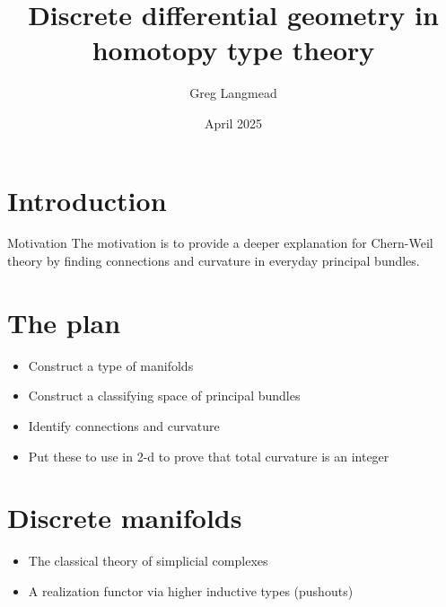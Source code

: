 \documentclass[14pt,aspectratio=169,compress]{beamer}
\title[Geometry in HoTT]{Discrete differential geometry in homotopy type theory}
\author{Greg Langmead}
\institute[CMU]{Carnegie Mellon University}
\date{April 2025}
\begin{document}
\begin{frame}
\titlepage
\end{frame}

\begin{frame}
\tableofcontents
\end{frame}


\section{Introduction}

\begin{frame}{Motivation}
The motivation is to provide \alert{a deeper explanation} for \alert{Chern-Weil theory} by finding \alert{connections} and \alert{curvature} in everyday \alert{principal bundles}.
\end{frame}


\section{The plan}
\begin{frame}
\begin{itemize}
\item Construct a type of manifolds
\item Construct a classifying space of principal bundles
\item Identify connections and curvature
\item Put these to use in 2-d to prove that total curvature is an integer
\end{itemize}
\end{frame}

\section{Discrete manifolds}

\begin{frame}
\begin{itemize}
\item The classical theory of \alert{simplicial complexes}
\item A \alert{realization} functor via higher inductive types (pushouts)
\end{itemize}
\end{frame}
\end{document}
